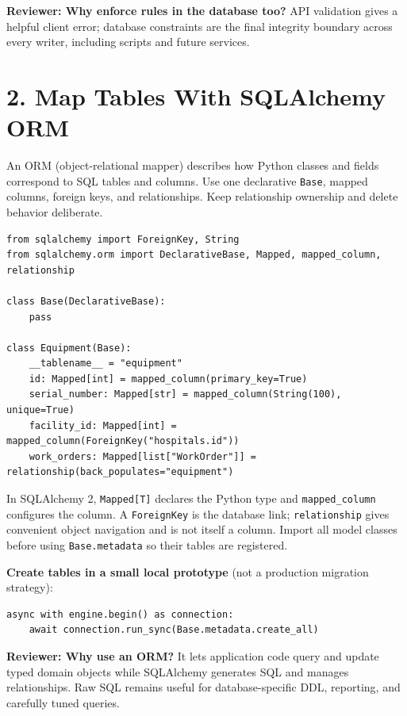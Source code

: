 \documentclass[10pt]{article}
\begin{document}
\textbf{Reviewer: Why enforce rules in the database too?} API validation gives a helpful client error; database constraints are the final integrity boundary across every writer, including scripts and future services.

\section{2. Map Tables With SQLAlchemy ORM}
An ORM (object-relational mapper) describes how Python classes and fields correspond to SQL tables and columns. Use one declarative \texttt{Base}, mapped columns, foreign keys, and relationships. Keep relationship ownership and delete behavior deliberate.
\begin{lstlisting}
from sqlalchemy import ForeignKey, String
from sqlalchemy.orm import DeclarativeBase, Mapped, mapped_column, relationship

class Base(DeclarativeBase):
    pass

class Equipment(Base):
    __tablename__ = "equipment"
    id: Mapped[int] = mapped_column(primary_key=True)
    serial_number: Mapped[str] = mapped_column(String(100), unique=True)
    facility_id: Mapped[int] = mapped_column(ForeignKey("hospitals.id"))
    work_orders: Mapped[list["WorkOrder"]] = relationship(back_populates="equipment")
\end{lstlisting}
In SQLAlchemy 2, \texttt{Mapped[T]} declares the Python type and \texttt{mapped\_column} configures the column. A \texttt{ForeignKey} is the database link; \texttt{relationship} gives convenient object navigation and is not itself a column. Import all model classes before using \texttt{Base.metadata} so their tables are registered.

\textbf{Create tables in a small local prototype} (not a production migration strategy):
\begin{lstlisting}
async with engine.begin() as connection:
    await connection.run_sync(Base.metadata.create_all)
\end{lstlisting}

\textbf{Reviewer: Why use an ORM?} It lets application code query and update typed domain objects while SQLAlchemy generates SQL and manages relationships. Raw SQL remains useful for database-specific DDL, reporting, and carefully tuned queries.
\end{document}

